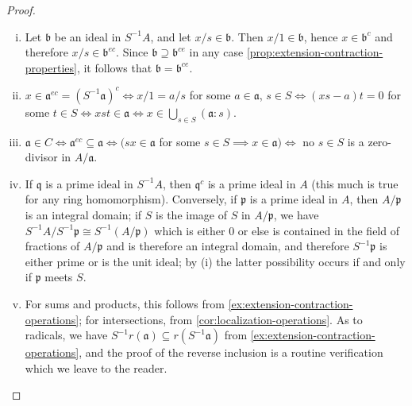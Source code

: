 \begin{proof}
    \begin{enumerate}[i)]
        \item Let $\mathfrak{b}$ be an ideal in $S^{-1}A$, and let $x/s \in \mathfrak{b}$. Then $x/1 \in \mathfrak{b}$, hence $x \in \mathfrak{b}^c$ and therefore $x/s \in \mathfrak{b}^{ec}$. Since $\mathfrak{b} \supseteq \mathfrak{b}^{ce}$ in any case \eqref{prop:extension-contraction-properties}, it follows that $\mathfrak{b} = \mathfrak{b}^{ce}$.
        \item $x \in \mathfrak{a}^{ec} = (S^{-1}\mathfrak{a})^c \iff x/1 = a/s$ for some $a \in \mathfrak{a}$, $s \in S \iff (xs - a)t = 0$ for some $t \in S \iff xst \in \mathfrak{a} \iff x \in \bigcup_{s \in S} (\mathfrak{a} : s)$.
        \item $\mathfrak{a} \in C \iff \mathfrak{a}^{ec} \subseteq \mathfrak{a} \iff (sx \in \mathfrak{a}$ for some $s \in S \implies x \in \mathfrak{a}) \iff$ no $s \in S$ is a zero-divisor in $A/\mathfrak{a}$.
        \item If $\mathfrak{q}$ is a prime ideal in $S^{-1}A$, then $\mathfrak{q}^c$ is a prime ideal in $A$ (this much is true for any ring homomorphism). Conversely, if $\mathfrak{p}$ is a prime ideal in $A$, then $A/\mathfrak{p}$ is an integral domain; if $S$ is the image of $S$ in $A/\mathfrak{p}$, we have $S^{-1}A/S^{-1}\mathfrak{p} \cong S^{-1}(A/\mathfrak{p})$ which is either $0$ or else is contained in the field of fractions of $A/\mathfrak{p}$ and is therefore an integral domain, and therefore $S^{-1}\mathfrak{p}$ is either prime or is the unit ideal; by (i) the latter possibility occurs if and only if $\mathfrak{p}$ meets $S$.
        \item For sums and products, this follows from \eqref{ex:extension-contraction-operations}; for intersections, from \eqref{cor:localization-operations}. As to radicals, we have $S^{-1}r(\mathfrak{a}) \subseteq r(S^{-1}\mathfrak{a})$ from \eqref{ex:extension-contraction-operations}, and the proof of the reverse inclusion is a routine verification which we leave to the reader. \qedhere
    \end{enumerate}
\end{proof}

